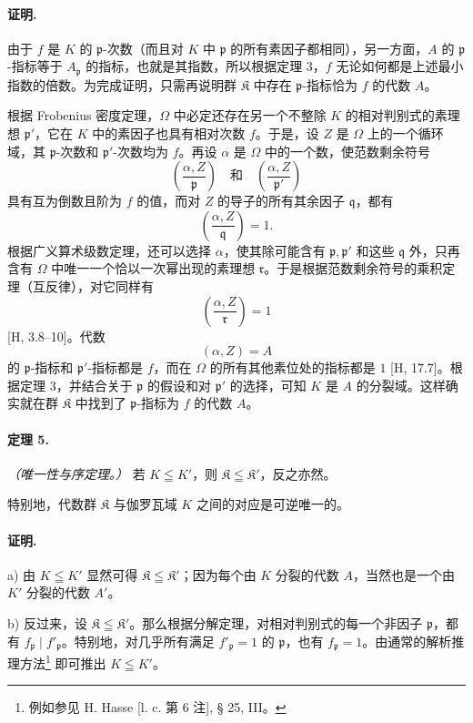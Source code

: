 \documentclass[11pt]{article}
\begin{document}
\paragraph{证明.}
由于 \(f\) 是 \(K\) 的 \(\mathfrak p\)-次数（而且对 \(K\) 中 \(\mathfrak p\) 的所有素因子都相同），另一方面，\(A\) 的 \(\mathfrak p\)-指标等于 \(A_{\mathfrak p}\) 的指标，也就是其指数，所以根据定理 3，\(f\) 无论如何都是上述最小指数的倍数。为完成证明，只需再说明群 \(\mathfrak K\) 中存在 \(\mathfrak p\)-指标恰为 \(f\) 的代数 \(A\)。

根据 Frobenius 密度定理，\(\Omega\) 中必定还存在另一个不整除 \(K\) 的相对判别式的素理想 \(\mathfrak p'\)，它在 \(K\) 中的素因子也具有相对次数 \(f\)。于是，设 \(Z\) 是 \(\Omega\) 上的一个循环域，其 \(\mathfrak p\)-次数和 \(\mathfrak p'\)-次数均为 \(f\)。再设 \(\alpha\) 是 \(\Omega\) 中的一个数，使范数剩余符号
\[
\left(\frac{\alpha,Z}{\mathfrak p}\right)\quad\text{和}\quad
\left(\frac{\alpha,Z}{\mathfrak p'}\right)
\]
具有互为倒数且阶为 \(f\) 的值，而对 \(Z\) 的导子的所有其余因子 \(\mathfrak q\)，都有
\[
\left(\frac{\alpha,Z}{\mathfrak q}\right)=1.
\]
根据广义算术级数定理，还可以选择 \(\alpha\)，使其除可能含有 \(\mathfrak p,\mathfrak p'\) 和这些 \(\mathfrak q\) 外，只再含有 \(\Omega\) 中唯一一个恰以一次幂出现的素理想 \(\mathfrak r\)。于是根据范数剩余符号的乘积定理（互反律），对它同样有
\[
\left(\frac{\alpha,Z}{\mathfrak r}\right)=1
\]
[H, 3.8--10]。代数
\[
        (\alpha,Z)=A
\]
的 \(\mathfrak p\)-指标和 \(\mathfrak p'\)-指标都是 \(f\)，而在 \(\Omega\) 的所有其他素位处的指标都是 \(1\) [H, 17.7]。根据定理 3，并结合关于 \(\mathfrak p\) 的假设和对 \(\mathfrak p'\) 的选择，可知 \(K\) 是 \(A\) 的分裂域。这样确实就在群 \(\mathfrak K\) 中找到了 \(\mathfrak p\)-指标为 \(f\) 的代数 \(A\)。

\paragraph{定理 5.}
\emph{（唯一性与序定理。）} 若 \(K\leqq K'\)，则 \(\mathfrak K\leqq\mathfrak K'\)，反之亦然。

特别地，代数群 \(\mathfrak K\) 与伽罗瓦域 \(K\) 之间的对应是可逆唯一的。

\paragraph{证明.}
a) 由 \(K\leqq K'\) 显然可得 \(\mathfrak K\leqq\mathfrak K'\)；因为每个由 \(K\) 分裂的代数 \(A\)，当然也是一个由 \(K'\) 分裂的代数 \(A'\)。

b) 反过来，设 \(\mathfrak K\leqq\mathfrak K'\)。那么根据分解定理，对相对判别式的每一个非因子 \(\mathfrak p\)，都有 \(f_{\mathfrak p}\mid f'_{\mathfrak p}\)。特别地，对几乎所有满足 \(f'_{\mathfrak p}=1\) 的 \(\mathfrak p\)，也有 \(f_{\mathfrak p}=1\)。由通常的解析推理方法\footnote{例如参见 H. Hasse [l. c. 第 6 注], § 25, III。} 即可推出 \(K\leqq K'\)。
\end{document}
